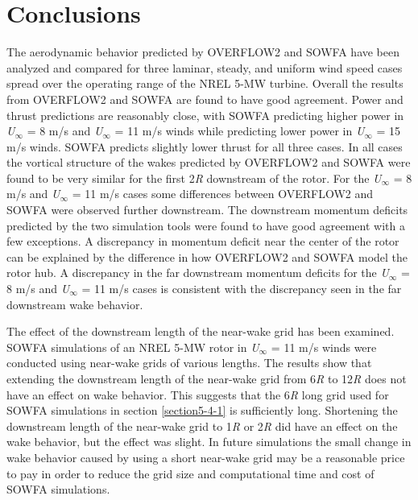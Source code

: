 
\section{Conclusions}\label{section5-5}
The aerodynamic behavior predicted by OVERFLOW2 and SOWFA have been analyzed and compared for three laminar, steady, and uniform wind speed cases spread over the operating range of the NREL 5-MW turbine. Overall the results from OVERFLOW2 and SOWFA are found to have good agreement.  Power and thrust predictions are reasonably close, with SOWFA predicting higher power in \emph{U$_\infty$} = 8 m/s and \emph{U$_\infty$} = 11 m/s winds while predicting lower power in \emph{U$_\infty$} = 15 m/s winds. SOWFA predicts slightly lower thrust for all three cases. In all cases the vortical structure of the wakes predicted by OVERFLOW2 and SOWFA were found to be very similar for the first 2\emph{R} downstream of the rotor. For the  \emph{U$_\infty$} = 8 m/s and \emph{U$_\infty$} = 11 m/s cases some differences between OVERFLOW2 and SOWFA were observed further downstream. The downstream momentum deficits predicted by the two simulation tools were found to have good agreement with a few exceptions. A discrepancy in momentum deficit near the center of the rotor can be explained by the difference in how OVERFLOW2 and SOWFA model the rotor hub. A discrepancy in the far downstream momentum deficits for the \emph{U$_\infty$} = 8 m/s and \emph{U$_\infty$} = 11 m/s  cases is consistent with the discrepancy seen in the far downstream wake behavior.

The effect of the downstream length of the near-wake grid has been examined. SOWFA simulations of an NREL 5-MW rotor in \emph{U$_\infty$} = 11 m/s winds were conducted using near-wake grids of various lengths. The results show that extending the downstream length of the near-wake grid from 6\emph{R} to 12\emph{R} does not have an effect on wake behavior. This suggests that the 6\emph{R} long grid used for SOWFA simulations in section \ref{section5-4-1} is sufficiently long. Shortening the downstream length of the near-wake grid to 1\emph{R} or 2\emph{R} did have an effect on the wake behavior, but the effect was slight. In future simulations the small change in wake behavior caused by using a short near-wake grid may be a reasonable price to pay in order to reduce the grid size and computational time and cost of SOWFA simulations.

